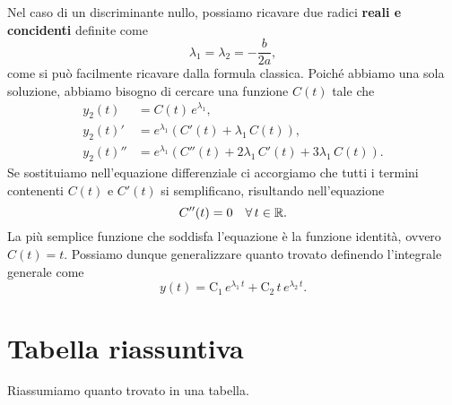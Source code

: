 \documentclass[../../analisi2]{subfiles}
\begin{document}
            Nel caso di un discriminante nullo, possiamo ricavare due radici \textbf{reali e concidenti} definite come
            \[
                \lambda_1 = \lambda_2 = -\frac{b}{2a},
            \]
            come si può facilmente ricavare dalla formula classica. Poiché abbiamo una sola soluzione, abbiamo bisogno di cercare una
            funzione \(C(t)\) tale che
            \begin{align*}
                y_2(t) &= C(t) \, e^{\lambda_1},\\
                y_2(t)' &= e^{\lambda_1} \left(C'(t) + \lambda_1 \, C(t)\right),\\
                y_2(t)'' &= e^{\lambda_1} \left(C''(t) + 2\lambda_1 \, C'(t) + 3\lambda_1 \, C(t)\right).
            \end{align*}
            Se sostituiamo nell'equazione differenziale ci accorgiamo che tutti i termini contenenti \(C(t)\) e \(C'(t)\) si
            semplificano, risultando nell'equazione
            \[
                C''(t) = 0 \quad \forall \, t \in \mathbb{R}.
            \]
            La più semplice funzione che soddisfa l'equazione è la funzione identità, ovvero \(C(t) = t\). Possiamo dunque generalizzare
            quanto trovato definendo l'integrale generale come
            \[
                y(t) = \mathrm{C_1} \, e^{\lambda_1 \, t} + \mathrm{C_2} \, t \, e^{\lambda_2 \, t}.
            \]

        \section{Tabella riassuntiva}

            Riassumiamo quanto trovato in una tabella.
\end{document}
